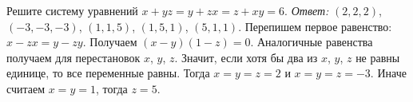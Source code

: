 \problem
Решите систему уравнений $x + y z = y + z x = z + x y = 6$.
\solution
\emph{Ответ:} $(2,2,2)$, $(-3,-3,-3)$, $(1,1,5)$, $(1,5,1)$, $(5,1,1)$.
Перепишем первое равенство: $x - z x = y - z y$.
Получаем $(x - y)(1 - z) = 0$.
Аналогичные равенства получаем для перестановок $x$, $y$, $z$.
Значит, если хотя бы два из $x$, $y$, $z$ не равны единице, то все переменные
равны.
Тогда $x = y = z = 2$ и $x = y = z = -3$.
Иначе считаем $x = y = 1$, тогда $z = 5$.
\endproblem
